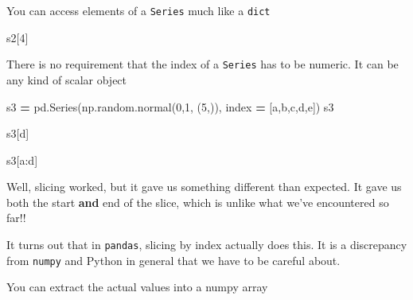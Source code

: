 \documentclass[
  letterpaper,
]{scrbook}
\newenvironment{Shaded}{\begin{snugshade}}{\end{snugshade}}
\newcommand{\DecValTok}[1]{\textcolor[rgb]{0.00,0.00,0.81}{#1}}
\newcommand{\NormalTok}[1]{#1}
\newcommand{\OperatorTok}[1]{\textcolor[rgb]{0.81,0.36,0.00}{\textbf{#1}}}
\newcommand{\StringTok}[1]{\textcolor[rgb]{0.31,0.60,0.02}{#1}}
\begin{document}
You can access elements of a \texttt{Series} much like a \texttt{dict}

\begin{Shaded}
\begin{Highlighting}[]
\NormalTok{s2[}\DecValTok{4}\NormalTok{]}
\end{Highlighting}
\end{Shaded}

There is no requirement that the index of a \texttt{Series} has to be numeric. It can be any kind of scalar object

\begin{Shaded}
\begin{Highlighting}[]
\NormalTok{s3 }\OperatorTok{=}\NormalTok{ pd.Series(np.random.normal(}\DecValTok{0}\NormalTok{,}\DecValTok{1}\NormalTok{, (}\DecValTok{5}\NormalTok{,)), index }\OperatorTok{=}\NormalTok{ [}\StringTok{\textquotesingle{}a\textquotesingle{}}\NormalTok{,}\StringTok{\textquotesingle{}b\textquotesingle{}}\NormalTok{,}\StringTok{\textquotesingle{}c\textquotesingle{}}\NormalTok{,}\StringTok{\textquotesingle{}d\textquotesingle{}}\NormalTok{,}\StringTok{\textquotesingle{}e\textquotesingle{}}\NormalTok{])}
\NormalTok{s3}
\end{Highlighting}
\end{Shaded}

\begin{Shaded}
\begin{Highlighting}[]
\NormalTok{s3[}\StringTok{\textquotesingle{}d\textquotesingle{}}\NormalTok{]}
\end{Highlighting}
\end{Shaded}

\begin{Shaded}
\begin{Highlighting}[]
\NormalTok{s3[}\StringTok{\textquotesingle{}a\textquotesingle{}}\NormalTok{:}\StringTok{\textquotesingle{}d\textquotesingle{}}\NormalTok{]}
\end{Highlighting}
\end{Shaded}

Well, slicing worked, but it gave us something different than expected. It gave us both the start \textbf{and} end of the slice, which is unlike what we've encountered so far!!

It turns out that in \texttt{pandas}, slicing by index actually does this. It is a discrepancy from \texttt{numpy} and Python in general that we have to be careful about.

You can extract the actual values into a numpy array
\end{document}
